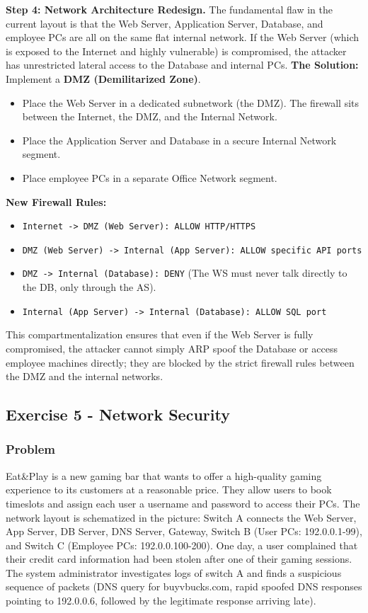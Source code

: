 \documentclass{article}
\begin{document}
\textbf{Step 4: Network Architecture Redesign.}
The fundamental flaw in the current layout is that the Web Server, Application Server, Database, and employee PCs are all on the same flat internal network. If the Web Server (which is exposed to the Internet and highly vulnerable) is compromised, the attacker has unrestricted lateral access to the Database and internal PCs.
\textbf{The Solution:} Implement a \textbf{DMZ (Demilitarized Zone)}.
\begin{itemize}
    \item[\textbf{1.}] Place the Web Server in a dedicated subnetwork (the DMZ). The firewall sits between the Internet, the DMZ, and the Internal Network.
    \item[\textbf{2.}] Place the Application Server and Database in a secure Internal Network segment.
    \item[\textbf{3.}] Place employee PCs in a separate Office Network segment.
\end{itemize}
\textbf{New Firewall Rules:}
\begin{itemize}
    \item \texttt{Internet -> DMZ (Web Server): ALLOW HTTP/HTTPS}
    \item \texttt{DMZ (Web Server) -> Internal (App Server): ALLOW specific API ports}
    \item \texttt{DMZ -> Internal (Database): DENY} (The WS must never talk directly to the DB, only through the AS).
    \item \texttt{Internal (App Server) -> Internal (Database): ALLOW SQL port}
\end{itemize}
This compartmentalization ensures that even if the Web Server is fully compromised, the attacker cannot simply ARP spoof the Database or access employee machines directly; they are blocked by the strict firewall rules between the DMZ and the internal networks.

\subsection{Exercise 5 - Network Security}
\subsubsection*{Problem}
Eat\&Play is a new gaming bar that wants to offer a high-quality gaming experience to its customers at a reasonable price. They allow users to book timeslots and assign each user a username and password to access their PCs. The network layout is schematized in the picture: Switch A connects the Web Server, App Server, DB Server, DNS Server, Gateway, Switch B (User PCs: 192.0.0.1-99), and Switch C (Employee PCs: 192.0.0.100-200).
One day, a user complained that their credit card information had been stolen after one of their gaming sessions. The system administrator investigates logs of switch A and finds a suspicious sequence of packets (DNS query for buyvbucks.com, rapid spoofed DNS responses pointing to 192.0.0.6, followed by the legitimate response arriving late).
\end{document}
